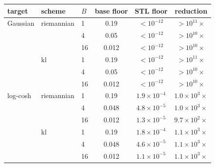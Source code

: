 \begin{tabular}{lll ccc}
\toprule
target & scheme & $B$ & base floor & STL floor & reduction \\
\midrule
Gaussian & riemannian & 1 & 0.19 & $<\!10^{-12}$ & $>\!10^{11}\times$ \\
 &  & 4 & 0.05 & $<\!10^{-12}$ & $>\!10^{10}\times$ \\
 &  & 16 & 0.012 & $<\!10^{-12}$ & $>\!10^{10}\times$ \\
\midrule
 & kl & 1 & 0.19 & $<\!10^{-12}$ & $>\!10^{11}\times$ \\
 &  & 4 & 0.05 & $<\!10^{-12}$ & $>\!10^{10}\times$ \\
 &  & 16 & 0.012 & $<\!10^{-12}$ & $>\!10^{10}\times$ \\
\midrule
log-cosh & riemannian & 1 & 0.19 & $1.9\times10^{-4}$ & $1.0\times10^{3}\times$ \\
 &  & 4 & 0.048 & $4.8\times10^{-5}$ & $1.0\times10^{3}\times$ \\
 &  & 16 & 0.012 & $1.3\times10^{-5}$ & $9.7\times10^{2}\times$ \\
\midrule
 & kl & 1 & 0.19 & $1.8\times10^{-4}$ & $1.1\times10^{3}\times$ \\
 &  & 4 & 0.048 & $4.6\times10^{-5}$ & $1.1\times10^{3}\times$ \\
 &  & 16 & 0.012 & $1.1\times10^{-5}$ & $1.1\times10^{3}\times$ \\
\bottomrule
\end{tabular}
